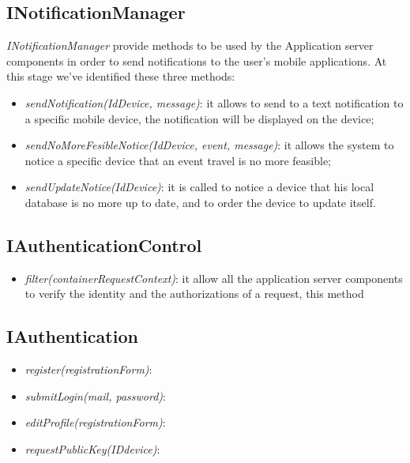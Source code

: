 \subsection{INotificationManager}
\label{subsect:INotificationManager}
\textit{INotificationManager} provide methods to be used by the Application server components in order to send notifications to the user's mobile applications. At this stage we've identified these three methods:
\begin{itemize}
	\item \textit{sendNotification(IdDevice, message)}: it allows to send to a text notification to a specific mobile device, the notification will be displayed on the device;
	\item \textit{sendNoMoreFesibleNotice(IdDevice, event, message)}: it allows the system to notice a specific device that an event travel is no more feasible;
	\item \textit{sendUpdateNotice(IdDevice)}: it is called to notice a device that his local database is no more up to date, and to order the device to update itself.
\end{itemize}

\subsection{IAuthenticationControl}
\label{subsect:IAuthenticationControl}

\begin{itemize}
	\item \textit{filter(containerRequestContext)}: it allow all the application server components to verify the identity and the authorizations of a request, this method 
\end{itemize}

\subsection{IAuthentication}
\label{subsect:IAuthentication}

\begin{itemize}
	\item \textit{register(registrationForm)}:
	\item\textit{submitLogin(mail, password)}:
	\item\textit{editProfile(registrationForm)}:
	\item\textit{requestPublicKey(IDdevice)}:
\end{itemize}

